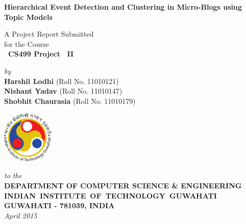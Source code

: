 \documentclass[12pt,a4paper]{report}
\theoremstyle{plain}
\theoremstyle{definition}
\theoremstyle{remark}
\begin{document}


\begin{titlepage}
\enlargethispage{3cm}

\begin{center}


\textbf{\Large Hierarchical Event Detection and Clustering in Micro-Blogs using Topic Models}

\vspace*{3cm}

 A Project Report Submitted \\
for the Course \\[2cm]

{\bf\Large\ CS499 Project ~II }\\

\vspace*{2cm}

{\large \emph{by}}\\[5pt]
{\large\bf {Harshil Lodhi}}
{\large (Roll No. 11010121)}\\
{\large\bf {Nishant Yadav}}
{\large (Roll No. 11010147)}\\
{\large\bf {Shobhit Chaurasia}}
{\large (Roll No. 11010179)}

\vspace*{3cm}
\includegraphics[height=2.5cm]{iitglogo}

\vspace*{0.5cm}

{\em\large to the}\\[10pt]
{\bf\large DEPARTMENT OF COMPUTER SCIENCE \& ENGINEERING} \\[5pt]
{\bf\large \mbox{INDIAN INSTITUTE OF TECHNOLOGY GUWAHATI}}\\[5pt]
{\bf\large GUWAHATI - 781039, INDIA}\\[10pt]
{\it\large April 2015}
\end{center}

\end{titlepage}

\clearpage
\end{document}
